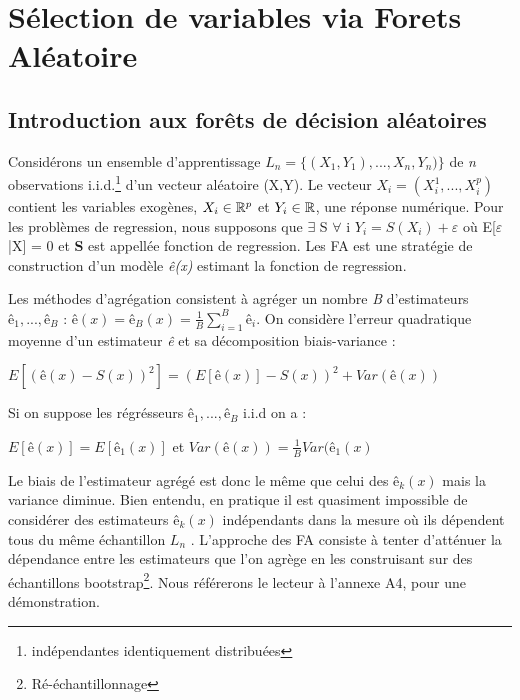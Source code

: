 	\chapter{Sélection de variables via Forets Aléatoire}
	\section{Introduction aux forêts de décision aléatoires}
	Considérons un ensemble d'apprentissage ${L_n = \{(X_1, Y_1),...,X_n, Y_n)\}}$ de \textit{n} observations i.i.d.\footnote{indépendantes identiquement distribuées} d'un vecteur aléatoire (X,Y). Le vecteur ${X_i = (X_i^1,...,X_i^p)}$ contient les variables exogènes, $X_i \in \mathbb{R}^p $ et $Y_i \in \mathbb{R} $, une réponse numérique. Pour les problèmes de regression, nous supposons que $ \exists$ S $\forall$ i $ Y_i=S(X_i)+\varepsilon$ où E[$\varepsilon$|X] = 0 et \textbf{S} est appellée fonction de regression. Les FA est une stratégie de construction d'un modèle \textit{ê(x)} estimant la fonction de regression.
	\par
	Les méthodes d’agrégation consistent à agréger un nombre \textit{B} d’estimateurs $ê_1,...,ê_\textit{B}$ : ${ê(x) = ê_B(x) =  \frac{1}{B} \sum_{i=1}^{B} ê_i}$. On considère l’erreur quadratique moyenne d’un estimateur \textit{ê} et sa décomposition biais-variance :
	\begin{center}
	${E[(ê(x)-S(x))^2] = (E[ê(x)] - S(x))^2 + Var(ê(x))}$
	\end{center}
	Si on suppose les régrésseurs $ê_1,...,ê_B$ i.i.d on a :
	\begin{center}
		$E[ê(x)] = E[ê_1(x)]$ et $Var(ê(x)) = \frac{1}{B} Var(ê_1(x)$
	\end{center}
	Le biais de l’estimateur agrégé est donc le même que celui des $ê_k(x)$ mais la variance diminue. Bien
	entendu, en pratique il est quasiment impossible de considérer des estimateurs $ê_k(x)$ indépendants
	dans la mesure où ils dépendent tous du même échantillon \textit{$L_n$} . L’approche des FA consiste à
	tenter d’atténuer la dépendance entre les estimateurs que l’on agrège en les construisant sur des
	échantillons bootstrap\footnote{Ré-échantillonnage}. Nous référerons le lecteur à l'annexe A4, pour une démonstration.


